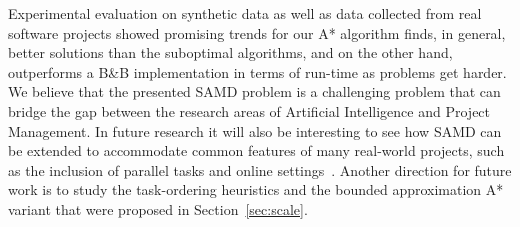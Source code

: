 \documentclass[letterpaper]{article} %
\newcommand{\samd}{\ac{SAMD}\xspace}
\newcommand{\astar}{\textsc{A*}\xspace}
\newcommand{\bnb}{\textsc{B\&B}\xspace}
\begin{document}
Experimental evaluation on synthetic data as well as data collected from real software projects showed promising trends for our \astar algorithm finds, in general, better solutions than the suboptimal algorithms, and on the other hand, outperforms a \bnb implementation in terms of run-time as problems get harder. %
We believe that the presented \samd problem is a challenging problem that can bridge the gap between the research areas of Artificial Intelligence and Project Management. In future research it will also be interesting to see how \samd can be extended to accommodate common features of many real-world projects, such as the inclusion of parallel tasks and online settings~\cite{hentenryck2009online}.
Another direction for future work is to study the task-ordering heuristics and the bounded approximation \astar variant that were proposed in Section~\ref{sec:scale}.
\end{document}
